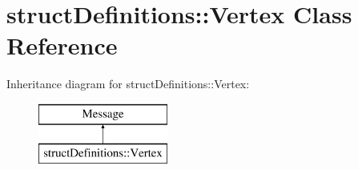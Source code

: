\hypertarget{classstruct_definitions_1_1_vertex}{}\section{struct\+Definitions\+:\+:Vertex Class Reference}
\label{classstruct_definitions_1_1_vertex}
Inheritance diagram for struct\+Definitions\+:\+:Vertex\+:\begin{figure}[H]
\begin{center}
\leavevmode
\includegraphics[height=2.000000cm]{classstruct_definitions_1_1_vertex}
\end{center}
\end{figure}
